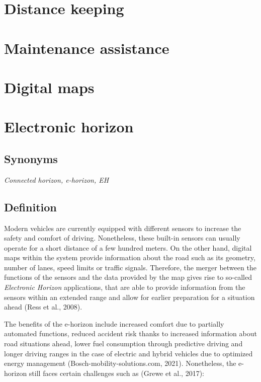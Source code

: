 \documentclass[
]{book}
\begin{document}
\hypertarget{distance_keeping}{%
\section{Distance keeping}\label{distance_keeping}}

\hypertarget{maintenance_assis}{%
\section{Maintenance assistance}\label{maintenance_assis}}

\hypertarget{digital_maps}{%
\section{Digital maps}\label{digital_maps}}

\hypertarget{ehorizon}{%
\section{Electronic horizon}\label{ehorizon}}

\hypertarget{synonyms-17}{%
\subsection*{Synonyms}\label{synonyms-17}}

\emph{Connected horizon, e-horizon, EH}

\hypertarget{definition-20}{%
\subsection*{Definition}\label{definition-20}}

Modern vehicles are currently equipped with different sensors to increase the safety and comfort of driving. Nonetheless, these built-in sensors can usually operate for a short distance of a few hundred meters. On the other hand, digital maps within the system provide information about the road such as its geometry, number of lanes, speed limits or traffic signals. Therefore, the merger between the functions of the sensors and the data provided by the map gives rise to so-called \emph{Electronic Horizon} applications, that are able to provide information from the sensors within an extended range and allow for earlier preparation for a situation ahead (Ress et al., 2008).

The benefits of the e-horizon include increased comfort due to partially automated functions, reduced accident risk thanks to increased information about road situations ahead, lower fuel consumption through predictive driving and longer driving ranges in the case of electric and hybrid vehicles due to optimized energy management (Bosch-mobility-solutions.com, 2021). Nonetheless, the e-horizon still faces certain challenges such as (Grewe et al., 2017):
\end{document}
